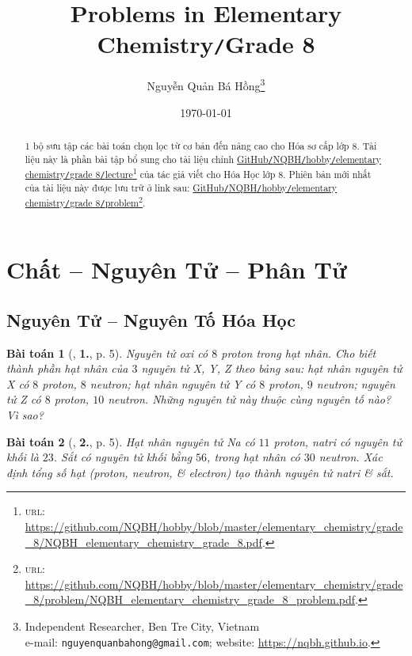 \documentclass{article}
\title{Problems in Elementary Chemistry\texttt{/}Grade 8}
\author{Nguyễn Quản Bá Hồng\footnote{Independent Researcher, Ben Tre City, Vietnam\\e-mail: \texttt{nguyenquanbahong@gmail.com}; website: \url{https://nqbh.github.io}.}}
\date{\today}
\numberwithin{equation}{section}
\newtheorem{baitoan}{Bài toán}[section]
\begin{document}
\maketitle
\begin{abstract}
	1 bộ sưu tập các bài toán chọn lọc từ cơ bản đến nâng cao cho Hóa sơ cấp lớp 8. Tài liệu này là phần bài tập bổ sung cho tài liệu chính \href{https://github.com/NQBH/hobby/blob/master/elementary_chemistry/grade_8/NQBH_elementary_chemistry_grade_8.pdf}{GitHub\texttt{/}NQBH\texttt{/}hobby\texttt{/}elementary chemistry\texttt{/}grade 8\texttt{/}lecture}\footnote{\textsc{url}: \url{https://github.com/NQBH/hobby/blob/master/elementary_chemistry/grade_8/NQBH_elementary_chemistry_grade_8.pdf}.} của tác giả viết cho Hóa Học lớp 8. Phiên bản mới nhất của tài liệu này được lưu trữ ở link sau: \href{https://github.com/NQBH/hobby/blob/master/elementary_chemistry/grade_8/problem/NQBH_elementary_chemistry_grade_8_problem.pdf}{GitHub\texttt{/}NQBH\texttt{/}hobby\texttt{/}elementary chemistry\texttt{/}grade 8\texttt{/}problem}\footnote{\textsc{url}: \url{https://github.com/NQBH/hobby/blob/master/elementary_chemistry/grade_8/problem/NQBH_elementary_chemistry_grade_8_problem.pdf}.}.
\end{abstract}
\tableofcontents
\newpage


\section{Chất -- Nguyên Tử -- Phân Tử}

\subsection{Nguyên Tử -- Nguyên Tố Hóa Học}

\begin{baitoan}[\cite{An2011}, \textbf{1.}, p. 5]
	Nguyên tử oxi có $8$ proton trong hạt nhân. Cho biết thành phần hạt nhân của $3$ nguyên tử X, Y, Z theo bảng sau: hạt nhân nguyên tử X có $8$ proton, $8$ neutron; hạt nhân nguyên tử Y có $8$ proton, $9$ neutron; nguyên tử Z có $8$ proton, $10$ neutron. Những nguyên tử này thuộc cùng nguyên tố nào? Vì sao?
\end{baitoan}

\begin{baitoan}[\cite{An2011}, \textbf{2.}, p. 5]
	Hạt nhân nguyên tử \emph{Na} có $11$ proton, natri có nguyên tử khối là $23$. Sắt có nguyên tử khối bằng $56$, trong hạt nhân có $30$ neutron. Xác định tổng số hạt (proton, neutron, \& electron) tạo thành nguyên tử natri \& sắt.
\end{baitoan}
\end{document}
